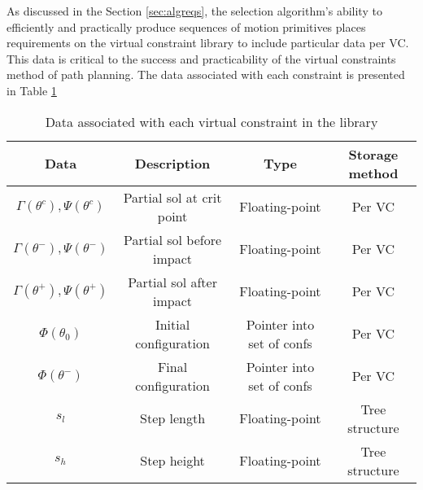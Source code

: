 As discussed in the Section \ref{sec:algreqs}, the selection algorithm's ability to efficiently and practically produce sequences of motion primitives places requirements on the virtual constraint library to include particular data per VC. This data is critical to the success and practicability of the virtual constraints method of path planning. The data associated with each constraint is presented in Table \ref{tab:datavc}

\begin{table}
	\centering
	\begin{tabular}{ c | c | c | c }
		Data                               & Description               & Type                      & Storage method \\ \hline
		$\Gamma(\theta^c), \Psi(\theta^c)$ & Partial sol at crit point & Floating-point            & Per VC         \\
		$\Gamma(\theta^-), \Psi(\theta^-)$ & Partial sol before impact & Floating-point            & Per VC         \\
		$\Gamma(\theta^+), \Psi(\theta^+)$ & Partial sol after impact  & Floating-point            & Per VC         \\
		$\Phi(\theta_0)$                   & Initial configuration     & Pointer into set of confs & Per VC         \\
		$\Phi(\theta^-)$                   & Final configuration       & Pointer into set of confs & Per VC         \\
		$s_l$                              & Step length               & Floating-point            & Tree structure \\
		$s_h$                              & Step height               & Floating-point            & Tree structure
	\end{tabular}
	\caption{Data associated with each virtual constraint in the library}
	\label{tab:datavc}
\end{table}